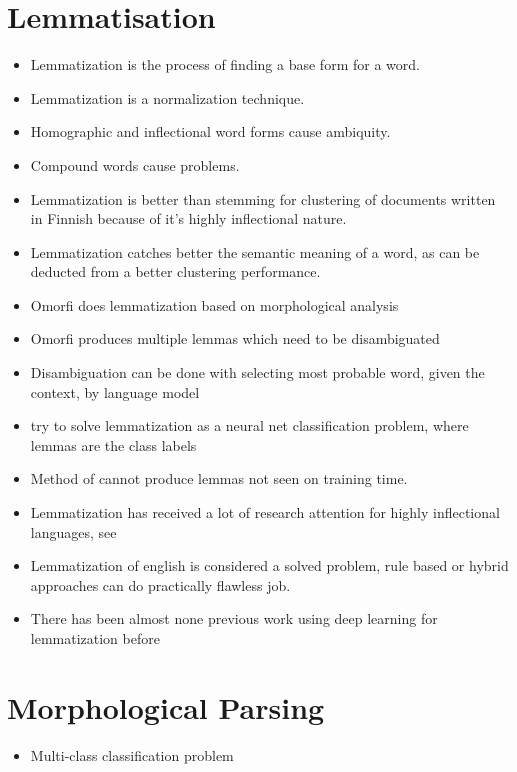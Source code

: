 \documentclass[12pt,a4paper,english
]{tutthesis}
\begin{document}
\section{Lemmatisation}
\label{se:lemmatisation}
\begin{itemize}
\item Lemmatization is the process of finding a base form for a word.
\item Lemmatization is a normalization technique. \cite{Korenius2004}
\item Homographic and inflectional word forms cause ambiquity. \cite{Korenius2004}
\item Compound words cause problems. \cite{Korenius2004}
\item Lemmatization is better than stemming for clustering of documents written in Finnish because of it's highly inflectional nature. \cite{Korenius2004}
\item Lemmatization catches better the semantic meaning of a word, as can be deducted from a better clustering performance.
\item Omorfi does lemmatization based on morphological analysis
\item Omorfi produces multiple lemmas which need to be disambiguated
\item Disambiguation can be done with selecting most probable word, given the context, by language model
\item \cite{Kestemont2016} try to solve lemmatization as a neural net classification problem, where lemmas are the class labels
\item Method of \cite{Kestemont2016} cannot produce lemmas not seen on training time.
\item Lemmatization has received a lot of research attention for highly inflectional languages, see \cite{Kestemont2016}
\item Lemmatization of english is considered a solved problem, rule based or hybrid approaches can do practically flawless job.
\item There has been almost none previous work using deep learning for lemmatization before \cite{Kestemont2016}
\end{itemize}

\section{Morphological Parsing}
\begin{itemize}
\item Multi-class classification problem
\end{itemize}
\end{document}
